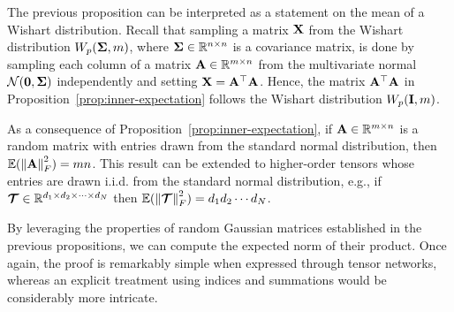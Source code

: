 The previous proposition can be interpreted as a statement on the mean of a Wishart distribution.  
Recall that  sampling a matrix $\mathbf{X}$ from the Wishart distribution $W_p(\mathbf{\Sigma}, m)$, where $\mathbf{\Sigma} \in \mathbb{R}^{n\times n}$ is a covariance matrix, is done by sampling each column of a matrix $\mathbf{A}\in\mathbb R^{m\times n}$ from the multivariate normal $\mathcal N(\mathbf{0} , \mathbf{\Sigma})$ independently and setting $\mathbf{X} = \mathbf{A}^\top\mathbf{A}$. Hence, the matrix $\mathbf{A} ^\top \mathbf{A}$ in Proposition~\ref{prop:inner-expectation} follows the Wishart distribution  $W_p(\mathbf{I},m)$.
\begin{remark} As a consequence of Proposition~\ref{prop:inner-expectation}, if $\mathbf{A} \in \mathbb{R}^{m \times n}$ is a random matrix with entries drawn from the standard normal distribution, then $\mathbb{E}(\left\lVert\mathbf{A}\right\rVert_F^2) = mn$. 
This result can be extended to higher-order tensors whose entries are drawn i.i.d. from the standard normal distribution, e.g., if $\bm{\mathcal{T}}\in\mathbb{R}^{d_1\times d_2\times\cdots\times d_N}$ then $\mathbb{E}(\left\lVert\bm{\mathcal{T}}\right\rVert_F^2) = d_1d_2\cdots d_N$.
\end{remark}
By leveraging the properties of random Gaussian matrices established in the previous propositions, we can compute the expected norm of their product. Once again, the proof is remarkably simple when expressed through tensor networks, whereas an explicit treatment using indices and summations would be considerably more intricate.
